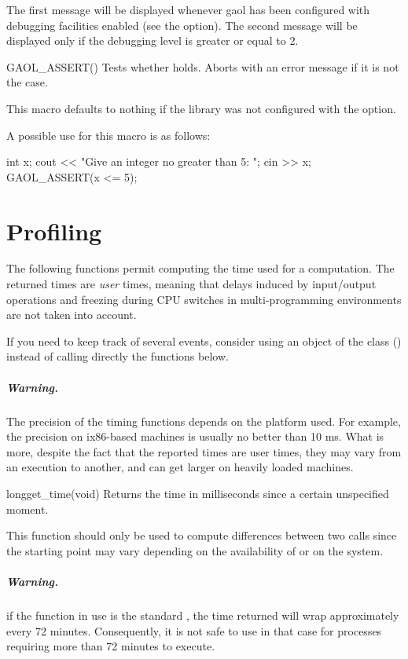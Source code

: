 \documentclass{manual}
\begin{document}
The first message will be displayed whenever gaol has been configured with
debugging facilities enabled (see the  option). The
second message will be displayed only if the debugging level
is greater or equal to 2.

\begin{defmacro}{GAOL\_ASSERT}{()}
Tests whether  holds. Aborts with an error message if it is not the case.

This macro defaults to nothing if the library was not configured with the
 option.
\end{defmacro}

\noindent
A possible use for this macro is as follows:

\begin{example}
int x;
cout << "Give an integer no greater than 5: ";
cin >> x;
GAOL_ASSERT(x <= 5);
\end{example}

\chapter{Profiling}

The following functions permit computing the time used for a computation. The
returned times are \emph{user} times, meaning that delays induced by
input/output operations and freezing during CPU switches in multi-programming
environments are not taken into account.

If you need to keep track of several events, consider using an object of the
 class () instead of calling
directly the functions below.

\paragraph*{Warning.} The precision of the timing functions depends on the platform
used. For example, the precision on ix86-based machines is usually no better
than 10 ms. What is more, despite the fact that the reported times are user
times, they may vary from an execution to another, and can get larger on
heavily loaded machines.


\begin{deffun}{long}{get\_time}{(void)}
Returns the time in milliseconds since a certain unspecified moment.

This function should only be used to compute differences between two
calls since the starting point may vary depending on the availability of
 or  on the system.


\paragraph*{Warning.} if the function in use is the standard ,
the time returned will wrap approximately every 72 minutes. Consequently, it is
not safe to use  in that case for processes requiring more than
72 minutes to execute.
\end{deffun}
\end{document}
